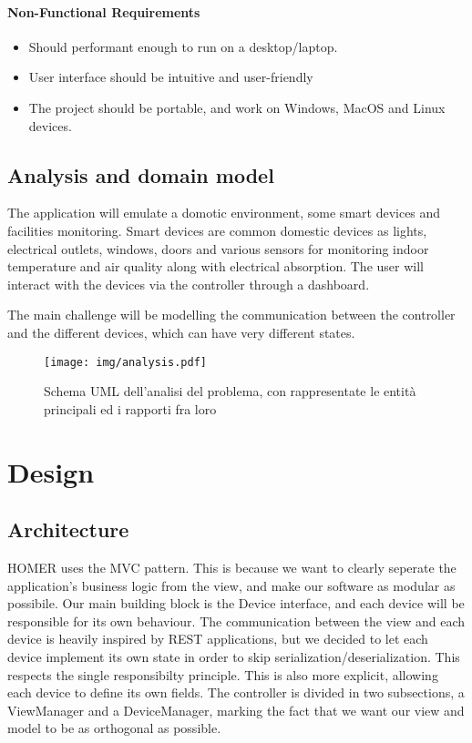 \documentclass[a4paper,12pt]{report}
\begin{document}
\subsubsection{Non-Functional Requirements}

\begin{itemize}
	\item Should performant enough to run on a desktop/laptop.
	\item User interface should be intuitive and user-friendly
	\item The project should be portable, and work on Windows, MacOS and Linux devices.
\end{itemize}

\section{Analysis and domain model}

The application will emulate a domotic environment, some smart devices and facilities monitoring.
Smart devices are common domestic devices as lights, electrical outlets, windows, doors and various sensors 
for monitoring indoor temperature and air quality along with electrical absorption.
The user will interact with the devices via the controller through a dashboard.

The main challenge will be modelling the communication between the controller 
and the different devices, which can have very different states.

\begin{figure}[H]
\centering{}
\texttt{[image: img/analysis.pdf]}
\caption{Schema UML dell'analisi del problema, con rappresentate le entità principali ed i rapporti fra loro}
\label{img:analysis}
\end{figure}

\chapter{Design}
\section{Architecture}

HOMER uses the MVC pattern. This is because we want to clearly seperate the application's business 
logic from the view, and make our software as modular as possibile. Our main building block is the Device interface, 
and each device will be responsible for its own behaviour. The communication between the view and each device 
is heavily inspired by REST applications, but we decided to let each device implement its own state in order to skip serialization/deserialization. 
This respects the single responsibilty principle. This is also more explicit, allowing each device to define its own fields.
The controller is divided in two subsections, a ViewManager and a DeviceManager, marking the fact that we want our view 
and model to be as orthogonal as possible.
\end{document}
